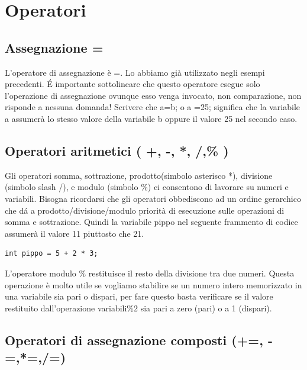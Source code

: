 \documentclass[11pt,fleqn]{book} %
\begin{document}
\section{Operatori}

\subsection{Assegnazione =}

L'operatore di assegnazione è =. Lo abbiamo già utilizzato negli esempi precedenti. \'E importante sottolineare che questo operatore esegue solo l'operazione di assegnazione ovunque esso venga invocato, non comparazione, non risponde a nessuna domanda! Scrivere che a=b; o a =25; significa che la variabile a assumerà lo stesso valore della variabile b oppure il valore 25 nel secondo caso.

\subsection{Operatori aritmetici ( +, -, *, /,\% )}

Gli operatori somma, sottrazione, prodotto(simbolo asterisco *), divisione (simbolo slash /), e modulo (simbolo \%) ci consentono di lavorare su numeri e variabili. Bisogna ricordarsi che gli operatori obbediscono ad un ordine gerarchico che d\'a a prodotto/divisione/modulo priorità di esecuzione sulle operazioni di somma e sottrazione. Quindi la variabile pippo nel seguente frammento di codice assumerà il valore 11 piuttosto che 21.
\begin{verbatim}
int pippo = 5 + 2 * 3;
\end{verbatim}

L'operatore modulo \% restituisce il resto della divisione tra due numeri.
Questa operazione è molto utile se vogliamo stabilire se un numero intero memorizzato in una variabile sia pari o dispari, per fare questo basta verificare se il valore restituito dall'operazione variabili\%2 sia pari a zero (pari) o a 1 (dispari).\\





\subsection{Operatori di assegnazione composti (+=, -=,*=,/=)}%
\end{document}
